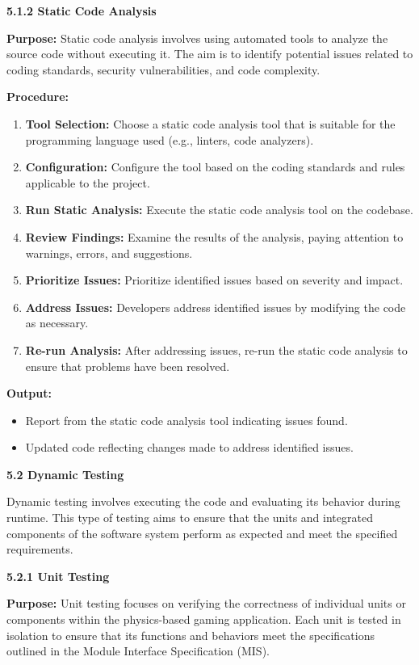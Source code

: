 \documentclass[
]{article}
\begin{document}
\textbf{5.1.2 Static Code Analysis}

\textbf{Purpose:} Static code analysis involves using automated tools to
analyze the source code without executing it. The aim is to identify
potential issues related to coding standards, security vulnerabilities,
and code complexity.

\textbf{Procedure:}

\begin{enumerate}
\def\labelenumi{\arabic{enumi}.}
\item
  \textbf{Tool Selection:} Choose a static code analysis tool that is
  suitable for the programming language used (e.g., linters, code
  analyzers).
\item
  \textbf{Configuration:} Configure the tool based on the coding
  standards and rules applicable to the project.
\item
  \textbf{Run Static Analysis:} Execute the static code analysis tool on
  the codebase.
\item
  \textbf{Review Findings:} Examine the results of the analysis, paying
  attention to warnings, errors, and suggestions.
\item
  \textbf{Prioritize Issues:} Prioritize identified issues based on
  severity and impact.
\item
  \textbf{Address Issues:} Developers address identified issues by
  modifying the code as necessary.
\item
  \textbf{Re-run Analysis:} After addressing issues, re-run the static
  code analysis to ensure that problems have been resolved.
\end{enumerate}

\textbf{Output:}

\begin{itemize}
\item
  Report from the static code analysis tool indicating issues found.
\item
  Updated code reflecting changes made to address identified issues.
\end{itemize}

\textbf{5.2 Dynamic Testing}

Dynamic testing involves executing the code and evaluating its behavior
during runtime. This type of testing aims to ensure that the units and
integrated components of the software system perform as expected and
meet the specified requirements.

\textbf{5.2.1 Unit Testing}

\textbf{Purpose:} Unit testing focuses on verifying the correctness of
individual units or components within the physics-based gaming
application. Each unit is tested in isolation to ensure that its
functions and behaviors meet the specifications outlined in the Module
Interface Specification (MIS).
\end{document}
